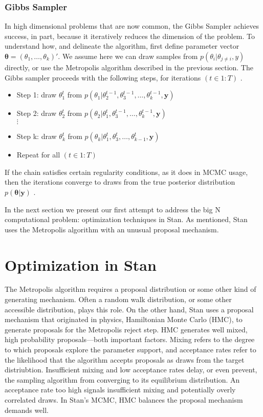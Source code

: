 \subsubsection{Gibbs Sampler}
In high dimensional problems that are now common, the Gibbs Sampler achieves success, in part, because it iteratively reduces the dimension of the problem. To understand how, and delineate the algorithm, first define parameter vector $\pmb{\theta} = (\theta_{1}, \dots, \theta_{k})'$. We assume here we can draw samples from $p(\theta_{i}|\theta_{j \neq i},y)$ directly, or use the Metropolis algorithm described in the previous section. The Gibbs sampler proceeds with the following steps, for iterations $(t \in 1:T)$ \citep{Banerjee2014}. 
        \begin{itemize} 
        \item Step 1: draw $\theta_{1}^{t}$ from $p \left( \theta_{1}|\theta_{2}^{t-1}, \theta_{3}^{t-1},\dots,\theta_{k}^{t-1},\pmb{y} \right)$ 
        \item Step 2: draw $\theta_{2}^{t}$ from $p \left(\theta_{2}|\theta_{1}^{t}, \theta_{3}^{t-1},\dots,\theta_{k}^{t-1},\pmb{y} \right)$ \\
        $\vdots$
        \item Step k: draw $\theta_{k}^{t}$ from $p \left( \theta_{k}|\theta_{1}^{t}, \theta_{3}^{t},\dots,\theta_{k-1}^{t},\pmb{y} \right)$ 
        \item Repeat for all $(t \in 1:T)$
        \end{itemize} 
If the chain satisfies certain regularity conditions, as it does in MCMC usage, then the iterations converge to draws from the true posterior distribution $p(\pmb{\theta}|\pmb{y})$ \citep{Banerjee2014}. 


In the next section we present our first attempt to address the big N computational problem: optimization techniques in Stan. As mentioned, Stan uses the Metropolis algorithm with an unusual proposal mechanism.

\section{Optimization in Stan} \label{stanopt} %

The Metropolis algorithm requires a proposal distribution or some other kind of  generating mechanism. Often a random walk distribution, or some other accessible distribution, plays this role. On the other hand, Stan uses a proposal mechanism that originated in physics, Hamiltonian Monte Carlo (HMC), to generate proposals for the Metropolis reject step. HMC generates well mixed, high probability proposals---both important factors. Mixing refers to the degree to which proposals explore the parameter support, and acceptance rates refer to the likelihood that the algorithm accepts proposals as draws from the target distriubtion. Insufficient mixing and low acceptance rates delay, or even prevent, the sampling algorithm from converging to its equilibrium distribution. An acceptance rate too high signals insufficient mixing and potentially overly correlated draws. In Stan's MCMC, HMC balances the proposal mechanism demands well. 

